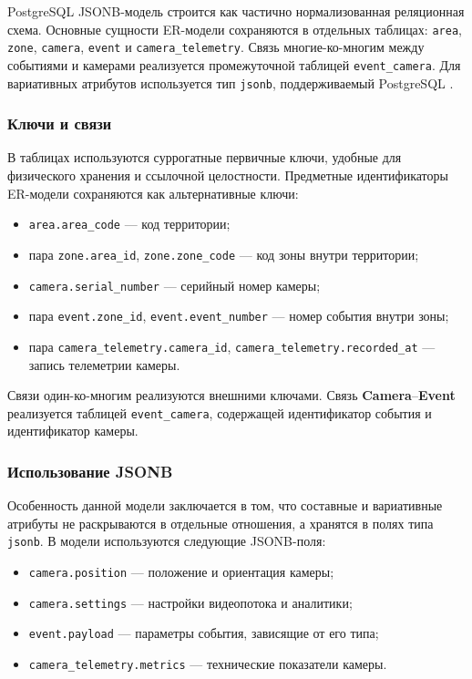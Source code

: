 PostgreSQL JSONB-модель строится как частично нормализованная реляционная
схема. Основные сущности ER-модели сохраняются в отдельных таблицах:
\texttt{area}, \texttt{zone}, \texttt{camera}, \texttt{event} и
\texttt{camera\_telemetry}. Связь многие-ко-многим между событиями и
камерами реализуется промежуточной таблицей \texttt{event\_camera}. Для
вариативных атрибутов используется тип \texttt{jsonb}, поддерживаемый
PostgreSQL \cite{postgresql_docs}.

\subsubsection{Ключи и связи}

В таблицах используются суррогатные первичные ключи, удобные для физического
хранения и ссылочной целостности. Предметные идентификаторы ER-модели
сохраняются как альтернативные ключи:

\begin{itemize}
  \item \texttt{area.area\_code} --- код территории;
  \item пара \texttt{zone.area\_id}, \texttt{zone.zone\_code} --- код зоны
        внутри территории;
  \item \texttt{camera.serial\_number} --- серийный номер камеры;
  \item пара \texttt{event.zone\_id}, \texttt{event.event\_number} --- номер
        события внутри зоны;
  \item пара \texttt{camera\_telemetry.camera\_id},
        \texttt{camera\_telemetry.recorded\_at} --- запись телеметрии камеры.
\end{itemize}

Связи один-ко-многим реализуются внешними ключами. Связь
\textbf{Camera}--\textbf{Event} реализуется таблицей
\texttt{event\_camera}, содержащей идентификатор события и идентификатор
камеры.

\subsubsection{Использование JSONB}

Особенность данной модели заключается в том, что составные и вариативные
атрибуты не раскрываются в отдельные отношения, а хранятся в полях типа
\texttt{jsonb}. В модели используются следующие JSONB-поля:

\begin{itemize}
  \item \texttt{camera.position} --- положение и ориентация камеры;
  \item \texttt{camera.settings} --- настройки видеопотока и аналитики;
  \item \texttt{event.payload} --- параметры события, зависящие от его типа;
  \item \texttt{camera\_telemetry.metrics} --- технические показатели камеры.
\end{itemize}

